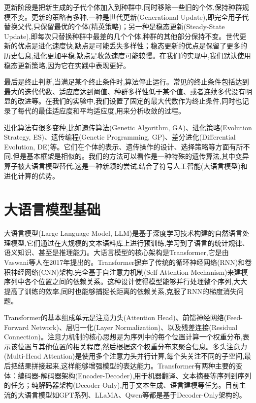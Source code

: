 更新阶段是把新生成的子代个体加入到种群中,同时移除一些旧的个体,保持种群规模不变。更新的策略有多种,一种是世代更新(Generational Update),即完全用子代替换父代,只保留最优的个体(精英策略)；另一种是稳态更新(Steady-State Update),即每次只替换种群中最差的几个个体,种群的其他部分保持不变。世代更新的优点是进化速度快,缺点是可能丢失多样性；稳态更新的优点是保留了更多的历史信息,进化更加平稳,缺点是收敛速度可能较慢。在我们的实现中,我们默认使用稳态更新策略,因为它在实践中表现更好。

最后是终止判断,当满足某个终止条件时,算法停止运行。常见的终止条件包括达到最大的迭代代数、适应度达到阈值、种群多样性低于某个值、或者连续多代没有明显的改进等。在我们的实验中,我们设置了固定的最大代数作为终止条件,同时也记录了每代的最佳适应度和平均适应度,用来分析收敛的过程。

进化算法有很多变种,比如遗传算法(Genetic Algorithm, GA)、进化策略(Evolution Strategy, ES)、遗传编程(Genetic Programming, GP)、差分进化(Differential Evolution, DE)等。它们在个体的表示、遗传操作的设计、选择策略等方面有所不同,但是基本框架是相似的。我们的方法可以看作是一种特殊的遗传算法,其中变异算子被大语言模型替代,这是一种新颖的尝试,结合了符号人工智能(大语言模型)和进化计算的优势。

\section{大语言模型基础}

大语言模型(Large Language Model, LLM)是基于深度学习技术构建的自然语言处理模型,它们通过在大规模的文本语料库上进行预训练,学习到了语言的统计规律、语义知识、甚至是推理能力。大语言模型的核心架构是Transformer,它是由Vaswani等人在2017年提出的。Transformer摒弃了传统的循环神经网络(RNN)和卷积神经网络(CNN)架构,完全基于自注意力机制(Self-Attention Mechanism)来建模序列中各个位置之间的依赖关系。这种设计使得模型能够并行处理整个序列,大大提高了训练的效率,同时也能够捕捉长距离的依赖关系,克服了RNN的梯度消失问题。

Transformer的基本组成单元是注意力头(Attention Head)、前馈神经网络(Feed-Forward Network)、层归一化(Layer Normalization)、以及残差连接(Residual Connection)。注意力机制的核心思想是为序列中的每个位置计算一个权重分布,表示该位置与其他位置的相关程度,然后根据这个权重分布来聚合信息。多头注意力(Multi-Head Attention)是使用多个注意力头并行计算,每个头关注不同的子空间,最后把结果拼接起来,这样能够增强模型的表达能力。Transformer有两种主要的变体：编码器-解码器架构(Encoder-Decoder),用于机器翻译、文本摘要等序列到序列的任务；纯解码器架构(Decoder-Only),用于文本生成、语言建模等任务。目前主流的大语言模型如GPT系列、LLaMA、Qwen等都是基于Decoder-Only架构的。

